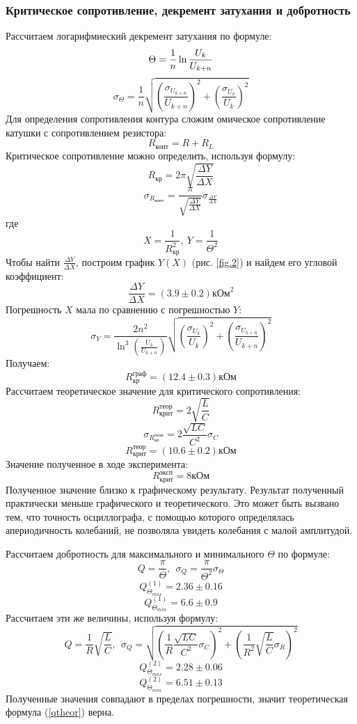 \documentclass{article}
\begin{document}
   
   \subsubsection*{Критическое сопротивление, декремент затухания и добротность}
   Рассчитаем логарифмиеский декремент затухания по формуле:
   \begin{equation}
   \label{decrement}
   \Theta = \frac{1}{n} \ln\frac{U_k}{U_{k + n}} \\ 
   \end{equation}
   $$ \sigma_{\Theta} = \frac{1}{n}\sqrt{\left(\frac{\sigma_{U_{k + n}}}{U_{k + n}}\right)^2 + \left(\frac{\sigma_{U_k}}{U_k}\right)^2} $$   
   Для определения сопротивления контура сложим омическое сопротивление катушки с сопротивлением резистора:
   $$ R_{\text{конт}} = R + R_L $$
   Критическое сопротивление можно определить, используя формулу:
   $$ R_{\text{кр}} = 2\pi\sqrt{\frac{\Delta Y}{\Delta X}} $$
   $$ \sigma_{R_{\text{конт}}} = \frac{\pi}{\sqrt{\frac{\Delta Y}{\Delta X}}}\sigma_{\frac{\Delta Y}{\Delta X}} $$
   где 
   $$ X = \frac{1}{R_{кр}^2},~ Y = \frac{1}{\Theta^2} $$
   Чтобы найти $ \frac{\Delta Y}{\Delta X} $, построим график $ Y(X) $ (рис. \ref{fig.2}) и найдем его угловой коэффициент:
   $$ \frac{\Delta Y}{\Delta X} = (3.9 \pm 0.2) \text{кОм}^2 $$
   Погрешность $X$ мала по сравнению с погрешностью $Y$:
   $$ \sigma_Y = \frac{2n^2}{\ln^3\left(\frac{U_k}{U_{k+n}}\right)} \sqrt{\left(\frac{\sigma_{U_{k}}}{U_k}\right)^2 + \left(\frac{\sigma_{U_{k+n}}}{U_{k + n}}\right)^2} $$
   Получаем:
   $$ R_{\text{кр}}^{\text{граф}} = (12.4 \pm 0.3)\text{кОм} $$
   Рассчитаем теоретическое значение для критического сопротивления:
   \begin{equation}
   \label{rcritth}
   R_{\text{крит}}^{\text{теор}} = 2\sqrt{\frac{L}{C}}
   \end{equation}   
   $$ \sigma_{R_{\text{кр}}^{\text{теор}}} = 2 \frac{\sqrt{LC}}{C^2} \sigma_C $$   
   $$ R_{\text{крит}}^{\text{теор}} = (10.6 \pm 0.2) \text{кОм} $$
   Значение полученное в ходе эксперимента:
   $$ R_{\text{крит}}^{\text{эксп}} = 8 \text{кОм} $$
   Полученное значение близко к графическому результату. Результат полученный практически меньше графического и теоретического. Это может быть вызвано тем, что точность осциллографа, с помощью которого определялась апериодичность колебаний, не позволяла увидеть колебания с малой амплитудой.
   
   Рассчитаем добротность для максимального и минимального $\Theta$ по формуле:
   $$ Q = \frac{\pi}{\Theta},~~ \sigma_Q = \frac{\pi}{\Theta^2} \sigma_{\Theta} $$
   $$ Q_{\Theta_{max}}^{(1)} = 2.36 \pm 0.16 $$ 
   $$ Q_{\Theta_{min}}^{(1)} = 6.6 \pm 0.9 $$
   Рассчитаем эти же величины, используя формулу:
   \begin{equation}
   \label{qtheor}
   Q = \frac{1}{R} \sqrt{\frac{L}{C}},~~ \sigma_Q = \sqrt{\left(\frac{1}{R}\frac{\sqrt{LC}}{C^2} \sigma_C\right)^2 + \left(\frac{1}{R^2}\sqrt{\frac{L}{C}}\sigma_R\right)^2}
   \end{equation}    
   $$ Q_{\Theta_{max}}^{(2)} = 2.28 \pm 0.06 $$ 
   $$ Q_{\Theta_{min}}^{(2)} = 6.51 \pm 0.13 $$
   Полученные значения совпадают в пределах погрешности, значит теоретическая формула (\ref{qtheor}) верна.
  
\end{document}
